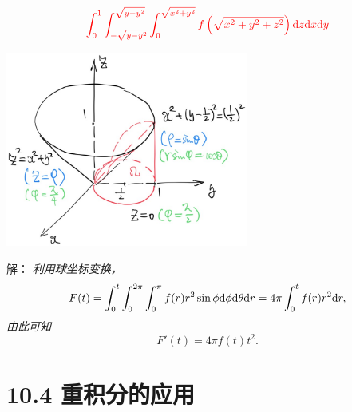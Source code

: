 \begin{frame}
	\linespread{1.5}
	$$\color{red}\displaystyle\int_0^1\displaystyle\int_{-\sqrt{y-y^2}}^{\sqrt{y-y^2}}
	\displaystyle\int_0^{\sqrt{x^2+y^2}}f\left(
	\sqrt{x^2+y^2+z^2}\right)\mathrm{d} z\mathrm{d} x\mathrm{d} y$$
	\begin{center}
		\includegraphics[width=0.6\textwidth]{./images/ch10/dxyz.jpg}
	\end{center}
\end{frame}

\begin{frame}
	\linespread{1.5}
	
	\small 解：\it
	利用球坐标变换，
	$$F(t)=\displaystyle\int_0^t\displaystyle\int_0^{2\pi}\displaystyle\int_0^{\pi}f(r)r^2\sin\phi\mathrm{d}\phi\mathrm{d}\theta\mathrm{d} r
	=4\pi\displaystyle\int_0^tf(r)r^2\mathrm{d} r,$$
	由此可知
	$$F'(t)=4\pi f(t)t^2.$$
	\fin
\end{frame}

\section{10.4 重积分的应用}

